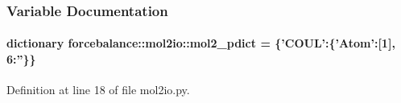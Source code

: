\subsubsection{\-Variable \-Documentation}
\hypertarget{namespaceforcebalance_1_1mol2io_af0073414a586dd18be75a1691b7e0ced}{
\paragraph[{mol2\-\_\-pdict}]{\setlength{\rightskip}{0pt plus 5cm}dictionary {\bf forcebalance\-::mol2io\-::mol2\-\_\-pdict} = \{'\-C\-O\-U\-L'\-:\{'\-Atom'\-:\mbox{[}1\mbox{]}, 6\-:''\}\}}}\label{namespaceforcebalance_1_1mol2io_af0073414a586dd18be75a1691b7e0ced}


\-Definition at line 18 of file mol2io.\-py.

